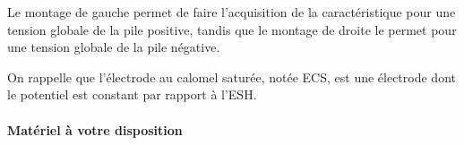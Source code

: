 \documentclass[twoside,a4paper,11pt,addpoints]{exam}%
\begin{document}
Le montage de gauche permet de faire l'acquisition de la caractéristique pour une tension globale de la pile positive, tandis que le montage de droite le permet pour une tension globale de la pile négative.

On rappelle que l'électrode au calomel saturée, notée ECS, est une électrode dont le potentiel est constant par rapport à l'ESH.




\paragraph*{Matériel à votre disposition}


\end{document}
